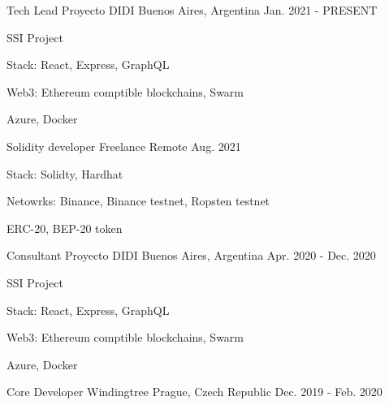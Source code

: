 


\begin{cventries}
\cventry
{Tech Lead} %
{Proyecto DIDI} %
{Buenos Aires, Argentina} %
{Jan. 2021 - PRESENT} %
{ %
\begin{cvitems}
\item {SSI Project}
\item {Stack: React, Express, GraphQL}
\item {Web3: Ethereum comptible blockchains, Swarm}
\item {Azure, Docker}
\end{cvitems}
}
\cventry
{Solidity developer} %
{Freelance} %
{Remote} %
{Aug. 2021} %
{ %
\begin{cvitems}
\item {Stack: Solidty, Hardhat}
\item {Netowrks: Binance, Binance testnet, Ropsten testnet}
\item {ERC-20, BEP-20 token}\end{cvitems}
}
\cventry
{Consultant} %
{Proyecto DIDI} %
{Buenos Aires, Argentina} %
{Apr. 2020 - Dec. 2020} %
{ %
\begin{cvitems}
\item {SSI Project}
\item {Stack: React, Express, GraphQL}
\item {Web3: Ethereum comptible blockchains, Swarm}
\item {Azure, Docker}
\end{cvitems}
}
\cventry
{Core Developer} %
{Windingtree} %
{Prague, Czech Republic} %
{Dec. 2019 - Feb. 2020} %

\end{cventries}
